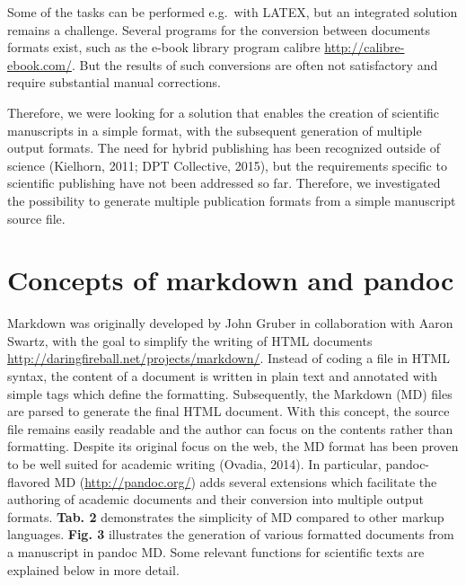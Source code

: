 \documentclass[10pt,fleqn]{wlpeerj}
\begin{document}
Some of the tasks can be performed e.g.~with LATEX, but an integrated
solution remains a challenge. Several programs for the conversion
between documents formats exist, such as the e-book library program
calibre \url{http://calibre-ebook.com/}. But the results of such
conversions are often not satisfactory and require substantial manual
corrections.

Therefore, we were looking for a solution that enables the creation of
scientific manuscripts in a simple format, with the subsequent
generation of multiple output formats. The need for hybrid publishing
has been recognized outside of science (Kielhorn, 2011; DPT Collective,
2015), but the requirements specific to scientific publishing have not
been addressed so far. Therefore, we investigated the possibility to
generate multiple publication formats from a simple manuscript source
file.

\section{Concepts of markdown and
pandoc}\label{concepts-of-markdown-and-pandoc}

Markdown was originally developed by John Gruber in collaboration with
Aaron Swartz, with the goal to simplify the writing of HTML documents
\url{http://daringfireball.net/projects/markdown/}. Instead of coding a
file in HTML syntax, the content of a document is written in plain text
and annotated with simple tags which define the formatting.
Subsequently, the Markdown (MD) files are parsed to generate the final
HTML document. With this concept, the source file remains easily
readable and the author can focus on the contents rather than
formatting. Despite its original focus on the web, the MD format has
been proven to be well suited for academic writing (Ovadia, 2014). In
particular, pandoc-flavored MD (\url{http://pandoc.org/}) adds several
extensions which facilitate the authoring of academic documents and
their conversion into multiple output formats. \textbf{Tab. 2}
demonstrates the simplicity of MD compared to other markup languages.
\textbf{Fig. 3} illustrates the generation of various formatted
documents from a manuscript in pandoc MD. Some relevant functions for
scientific texts are explained below in more detail.
\end{document}
